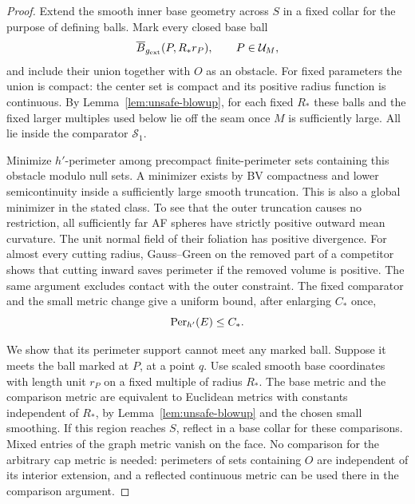 \begin{proof}
Extend the smooth inner base geometry across \(S\) in a fixed
collar for the purpose of defining balls.  Mark every closed base
ball
\begin{equation}
 \overline B_{g_{\rm ext}}(P,R_*r_P),\qquad P\in\mathcal U_M,
 \label{eq:unsafe-marked-balls}
\end{equation}
and include their union together with \(O\) as an obstacle.
For fixed parameters the union is compact: the center set is
compact and its positive radius function is continuous.  By
Lemma~\ref{lem:unsafe-blowup}, for each fixed \(R_*\) these
balls and the fixed larger multiples used below lie off the seam
once \(M\) is sufficiently large.  All lie inside the comparator
\(\mathcal S_1\).

Minimize \(h'\)-perimeter among precompact finite-perimeter
sets containing this obstacle modulo null sets.  A minimizer
exists by BV compactness and lower semicontinuity inside a
sufficiently large smooth truncation.  This is also a global
minimizer in the stated class.  To see that the outer truncation
causes no restriction, all sufficiently far AF spheres have
strictly positive outward mean curvature.  The unit normal field
of their foliation has positive divergence.  For almost every
cutting radius, Gauss--Green on the removed part of a competitor
shows that cutting inward saves perimeter if the removed volume
is positive.  The same argument excludes contact with the outer
constraint.  The fixed comparator and the small metric change
give a uniform bound, after enlarging \(C_*\) once,
\begin{equation}
 \operatorname{Per}_{h'}(E)\le C_*.
 \label{eq:unsafe-enclosure-bound}
\end{equation}

We show that its perimeter support cannot meet any marked ball.
Suppose it meets the ball marked at \(P\), at a point \(q\).
Use scaled smooth base coordinates with length unit \(r_P\)
on a fixed multiple of radius \(R_*\).  The base metric and
the comparison metric are equivalent to Euclidean metrics with
constants independent of \(R_*\), by
Lemma~\ref{lem:unsafe-blowup} and the chosen small smoothing.
If this region reaches \(S\), reflect in a base collar for these
comparisons.  Mixed entries of the graph metric vanish on the
face.  No comparison for the arbitrary cap metric is needed:
perimeters of sets containing \(O\) are independent of its
interior extension, and a reflected continuous metric can be
used there in the comparison argument.


\end{proof}
